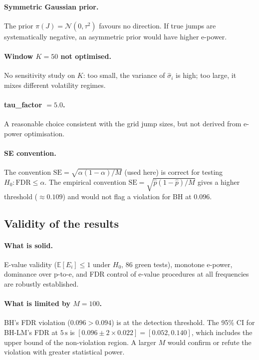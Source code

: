 \documentclass[11pt,a4paper]{article}
\theoremstyle{plain}
\theoremstyle{definition}
\theoremstyle{remark}
\newcommand{\E}{\mathbb{E}}
\newcommand{\FDR}{\mathrm{FDR}}
\begin{document}
\paragraph{Symmetric Gaussian prior.}
The prior $\pi(J) = \mathcal{N}(0, \tau^2)$ favours no direction. If true
jumps are systematically negative, an asymmetric prior would have higher
e-power.

\paragraph{Window $K = 50$ not optimised.}
No sensitivity study on $K$: too small, the variance of $\hat{\sigma}_i$ is
high; too large, it mixes different volatility regimes.

\paragraph{tau\_factor $= 5.0$.}
A reasonable choice consistent with the grid jump sizes, but not derived
from e-power optimisation.

 \paragraph{SE convention.}
    The convention $\mathrm{SE} = \sqrt{\alpha(1-\alpha)/M}$ (used here) is
    correct for testing $H_0 : \FDR \le \alpha$. The empirical convention
    $\mathrm{SE} = \sqrt{\hat{p}(1-\hat{p})/M}$ gives a higher threshold
    ($\approx 0.109$) and would not flag a violation for BH at $0.096$.

\subsection{Validity of the results}

\paragraph{What is solid.}
E-value validity ($\E[E_i] \le 1$ under $H_0$, 86 green tests), monotone
e-power, dominance over p-to-e, and FDR control of e-value procedures at
all frequencies are robustly established.

\paragraph{What is limited by $M = 100$.}
BH's FDR violation ($0.096 > 0.094$) is at the detection threshold. The
95\% CI for BH-LM's FDR at $5\,\mathrm{s}$ is
$[0.096 \pm 2 \times 0.022] = [0.052, 0.140]$, which includes the upper
bound of the non-violation region. A larger $M$ would confirm or refute the
violation with greater statistical power.
\end{document}
